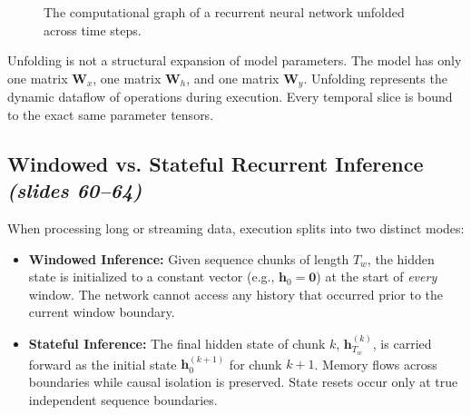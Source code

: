 \documentclass[11pt,a4paper]{article}
\theoremstyle{definition}
\theoremstyle{plain}
\begin{document}
\begin{figure}[htbp]
\centering
{}
\caption{The computational graph of a recurrent neural network unfolded across time steps.}
\end{figure}

\begin{intuitionbox}
Unfolding is not a structural expansion of model parameters. The model has only one matrix $\mathbf{W}_x$, one matrix $\mathbf{W}_h$, and one matrix $\mathbf{W}_y$. Unfolding represents the dynamic dataflow of operations during execution. Every temporal slice is bound to the exact same parameter tensors.
\end{intuitionbox}

\subsection{Windowed vs. Stateful Recurrent Inference \emph{(slides 60--64)}}
When processing long or streaming data, execution splits into two distinct modes:
\begin{itemize}
    \item \textbf{Windowed Inference:} Given sequence chunks of length $T_w$, the hidden state is initialized to a constant vector (e.g., $\mathbf{h}_0 = \mathbf{0}$) at the start of \emph{every} window. The network cannot access any history that occurred prior to the current window boundary.
    \item \textbf{Stateful Inference:} The final hidden state of chunk $k$, $\mathbf{h}_{T_w}^{(k)}$, is carried forward as the initial state $\mathbf{h}_0^{(k+1)}$ for chunk $k+1$. Memory flows across boundaries while causal isolation is preserved. State resets occur only at true independent sequence boundaries.
\end{itemize}
\end{document}
